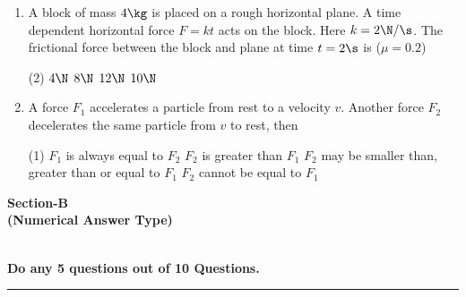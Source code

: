 \documentclass{article}
\newcommand{\ans}{\textcolor{red!95}{\textit{\quad}}}
\begin{document}
\begin{enumerate}
\item A block of mass $4 \kg$ is placed on a rough horizontal plane. A time dependent horizontal force $F = kt$ acts on the block. Here $k = 2 \N/\s$. The frictional force between the block and plane at
time $t = 2\s$ is ($\mu = 0.2$)
\begin{tasks}(2)
	\task $4\N$
	\task $8\N$\ans
	\task $12\N$
	\task $10\N$
\end{tasks}

\item A force $F_1$ accelerates a particle from rest to a velocity $v$. Another force $F_2$ decelerates the same particle from $v$ to rest, then
\begin{tasks}(1)
	\task $F_1$ is always equal to $F_2$\ans
	\task $F_2$ is greater than $F_1$
	\task $F_2$ may be smaller than, greater than or equal to $F_1$
	\task $F_2$ cannot be equal to $F_1$
\end{tasks}

\end{enumerate}



\begin{center}
\textbf{Section-B\\(Numerical Answer Type)}

{}\\

\textbf{Do any 5 questions out of 10 Questions.}

\rule{\textwidth}{1 pt}
\end{center}
\end{document}
